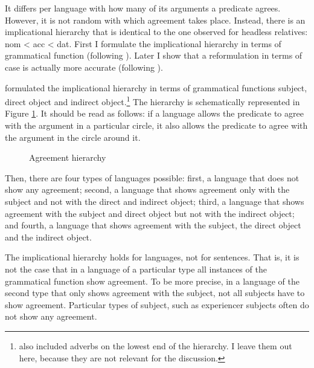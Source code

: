 It differs per language with how many of its arguments a predicate agrees. However, it is not random with which agreement takes place. Instead, there is an implicational hierarchy that is identical to the one observed for headless relatives: \ac{nom} < \ac{acc} < \ac{dat}. First I formulate the implicational hierarchy in terms of grammatical function (following \citealt{moravcsik1978}). Later I show that a reformulation in terms of case is actually more accurate (following \citealt{bobaljik2006}).

\citet{moravcsik1978} formulated the implicational hierarchy in terms of grammatical functions subject, direct object and indirect object.\footnote{
\citet{moravcsik1978} also included adverbs on the lowest end of the hierarchy. I leave them out here, because they are not relevant for the discussion.
}
The hierarchy is schematically represented in Figure \ref{fig:agr-sub-do-io}. It should be read as follows: if a language allows the predicate to agree with the argument in a particular circle, it also allows the predicate to agree with the argument in the circle around it.

\begin{figure}[H]
  \centering
  \caption{Agreement hierarchy}
  \label{fig:agr-sub-do-io}
\end{figure}

Then, there are four types of languages possible: first, a language that does not show any agreement; second, a language that shows agreement only with the subject and not with the direct and indirect object; third, a language that shows agreement with the subject and direct object but not with the indirect object; and fourth, a language that shows agreement with the subject, the direct object and the indirect object.

The implicational hierarchy holds for languages, not for sentences. That is, it is not the case that in a language of a particular type all instances of the grammatical function show agreement. To be more precise, in a language of the second type that only shows agreement with the subject, not all subjects have to show agreement. Particular types of subject, such as experiencer subjects often do not show any agreement.

